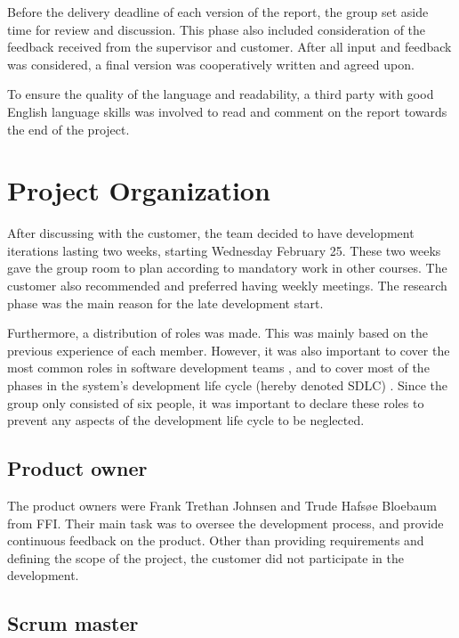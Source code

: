 Before the delivery deadline of each version of the report, the group set aside time for review and discussion. This phase also included consideration of the feedback received from the supervisor and customer. After all input and feedback was considered, a final version was cooperatively written and agreed upon.

To ensure the quality of the language and readability, a third party with good English language skills was involved to read and comment on the report towards the end of the project.

\section{Project Organization}
\label{sec:process_and_methodology-project_organization}

After discussing with the customer, the team decided to have development iterations lasting two weeks, starting Wednesday February 25. These two weeks gave the group room to plan according to mandatory work in other courses. The customer also recommended and preferred having weekly meetings. The research phase was the main reason for the late development start.

Furthermore, a distribution of roles was made. This was mainly based on the previous experience of each member. However, it was also important to cover the most common roles in software development teams \cite{software-roles}, and to cover most of the phases in the system's development life cycle (hereby denoted SDLC) \cite{sdlc}. Since the group only consisted of six people, it was important to declare these roles to prevent any aspects of the development life cycle to be neglected.

\subsection{Product owner}
\label{subsec:process_and_methodology-project_organization-product_owner}

The product owners were Frank Trethan Johnsen and Trude Hafsøe Bloebaum from FFI. Their main task was to oversee the development process, and provide continuous feedback on the product. Other than providing requirements and defining the scope of the project, the customer did not participate in the development.

\subsection{Scrum master}
\label{subsec:process_and_methodology-project_organization-scrum_master}

